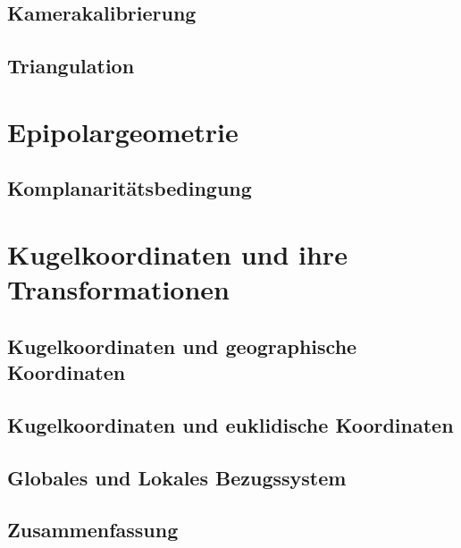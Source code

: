 \documentclass[a4paper,12pt]{report}
\begin{document}
		\subsection{Kamerakalibrierung}\label{subsec:kamerakalibrierung}
			
		\subsection{Triangulation}\label{subsec:triangulation}
			
	\section{Epipolargeometrie}\label{sec:epipolargeometrie}
		
		\subsection{Komplanaritätsbedingung}\label{subsec:komplanaritätsbedingung}
			
	\section{Kugelkoordinaten und ihre Transformationen}\label{sec:kugelkoordinaten_und_ihre_transformationen}
		
		\subsection{Kugelkoordinaten und geographische Koordinaten}
			
		\subsection{Kugelkoordinaten und euklidische Koordinaten}
			
		\subsection{Globales und Lokales Bezugssystem}
			
		\subsection{Zusammenfassung}
			
\end{document}
